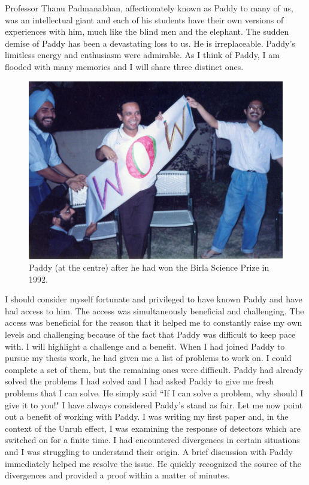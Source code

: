 \documentclass[prd, preprint, longbibliography, 11pt]{revtex4-1}
\begin{document}
\noindent Professor Thanu Padmanabhan, affectionately known as Paddy to many of us,
was an intellectual giant and each of his students have their own versions 
of experiences with him, much like the blind men and the elephant. 
The sudden demise of Paddy has been a devastating loss to us. 
He is irreplaceable.
Paddy's limitless energy and enthusiasm were admirable. 
As I think of Paddy, I am flooded with many memories and I will share three 
distinct ones.
\begin{figure}[!h]
\centering
\includegraphics[width=12.00cm]{paddy-wow.jpg}
\caption*{Paddy (at the centre) after he had won the Birla Science Prize in 1992.} 
\end{figure}

I should consider myself fortunate and privileged to have known Paddy and 
have had access to him. 
The access was simultaneously beneficial and challenging. 
The access was beneficial for the reason that it helped me to constantly 
raise my own levels and challenging because of the fact that Paddy was 
difficult to keep pace with.
I will highlight a challenge and a benefit. 
When I had joined Paddy to pursue my thesis work, he had given me a list of 
problems to work on. 
I could complete a set of them, but the remaining ones were difficult. 
Paddy had already solved the problems I had solved and I had asked Paddy to
give me fresh problems that I can solve. 
He simply said ``If I can solve a problem, why should I give it to you!" 
I have always considered Paddy's stand as fair.  
Let me now point out a benefit of working with Paddy. 
I was writing my first paper and, in the context of the Unruh effect, I was
examining the response of detectors which are switched on for a finite time. 
I had encountered divergences in certain situations and I was struggling to 
understand their origin. 
A brief discussion with Paddy immediately helped me resolve the issue. 
He quickly recognized the source of the divergences and provided a proof
within a matter of minutes. 
\end{document}

